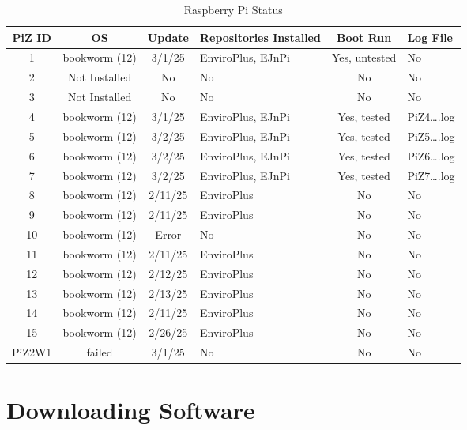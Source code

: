 \documentclass{article}
\begin{document}
\begin{table}[h!]
\begin{center}
\begin{tabular}{|c|c|c|p{2.3cm}|c| l|}
\hline
\textbf{PiZ ID} & \textbf{OS} & \textbf{Update} & \textbf{Repositories Installed} & \textbf{Boot Run} & \textbf{Log File} \\
\hline
1  & bookworm (12)    & 3/1/25 & EnviroPlus, EJnPi & Yes, untested  & No\\
2  & Not Installed    & No & No  & No & No\\
3  & Not Installed    & No & No & No & No\\
4  & bookworm (12)    & 3/1/25 & EnviroPlus, EJnPi & Yes, tested & PiZ4\ldots.log \\

5  & bookworm (12)    & 3/2/25 & EnviroPlus, EJnPi & Yes, tested & PiZ5\ldots.log \\
6  & bookworm (12)    & 3/2/25 & EnviroPlus, EJnPi & Yes, tested & PiZ6\ldots.log \\
7  & bookworm (12)    & 3/2/25 & EnviroPlus, EJnPi & Yes, tested & PiZ7\ldots.log \\
8  & bookworm (12)    & 2/11/25 & EnviroPlus & No & No \\

9  & bookworm (12)    & 2/11/25 & EnviroPlus & No & No \\
10 & bookworm (12)    & Error & No & No & No \\
11 & bookworm (12)    & 2/11/25 & EnviroPlus & No & No \\
12 & bookworm (12)    & 2/12/25 & EnviroPlus & No & No \\

13 & bookworm (12)    & 2/13/25 & EnviroPlus & No & No \\
14 & bookworm (12)    & 2/11/25 & EnviroPlus & No & No  \\
15 & bookworm (12)    & 2/26/25 & EnviroPlus & No & No \\
PiZ2W1 & failed       & 3/1/25  & No & No & No \\


\hline
\end{tabular}
\end{center}
\caption{Raspberry Pi Status}
\label{table:1}
\end{table}



\section{Downloading Software}
\end{document}
